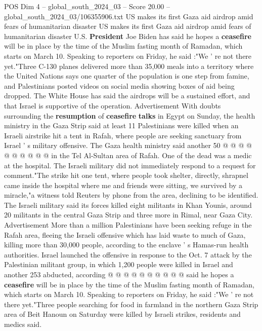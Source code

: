 \begin{textsample}{POS Dim 4 – global\_south\_2024\_03 – Score 20.00 – global\_south\_2024\_03/106355906.txt}  \label{ex:f4_pos_105}
US makes its first Gaza aid airdrop amid fears of humanitarian disaster US makes its first Gaza aid airdrop amid fears of humanitarian disaster U.S. \textbf{President} Joe Biden has said he hopes a \textbf{ceasefire} will be in place by the time of the Muslim fasting month of Ramadan, which starts on March 10.
Speaking to reporters on Friday, he said :"We ' re not there yet."Three C-130 planes delivered more than 35,000 meals into a territory where the United Nations says one quarter of the population is one step from famine, and Palestinians posted videos on social media showing boxes of aid being dropped.
The White House has said the airdrops will be a sustained effort, and that Israel is supportive of the operation.
Advertisement With doubts surrounding the \textbf{resumption} of \textbf{ceasefire} \textbf{talks} in Egypt on Sunday, the health ministry in the Gaza Strip said at least 11 Palestinians were killed when an Israeli airstrike hit a tent in Rafah, where people are seeking sanctuary from Israel ' s military offensive.
The Gaza health ministry said another 50 @ @ @ @ @ @ @ @ @ @ in the Tel Al-Sultan area of Rafah.
One of the dead was a medic at the hospital.
The Israeli military did not immediately respond to a request for comment."The strike hit one tent, where people took shelter, directly, shrapnel came inside the hospital where me and friends were sitting, we survived by a miracle,"a witness told Reuters by phone from the area, declining to be identified.
The Israeli military said its forces killed eight militants in Khan Younis, around 20 militants in the central Gaza Strip and three more in Rimal, near Gaza City.
Advertisement More than a million Palestinians have been seeking refuge in the Rafah area, fleeing the Israeli offensive which has laid waste to much of Gaza, killing more than 30,000 people, according to the enclave ' s Hamas-run health authorities.
Israel launched the offensive in response to the Oct. 7 attack by the Palestinian militant group, in which 1,200 people were killed in Israel and another 253 abducted, according @ @ @ @ @ @ @ @ @ @ said he hopes a \textbf{ceasefire} will be in place by the time of the Muslim fasting month of Ramadan, which starts on March 10.
Speaking to reporters on Friday, he said :"We ' re not there yet."Three people searching for food in farmland in the northern Gaza Strip area of Beit Hanoun on Saturday were killed by Israeli strikes, residents and medics said.

\end{textsample}
